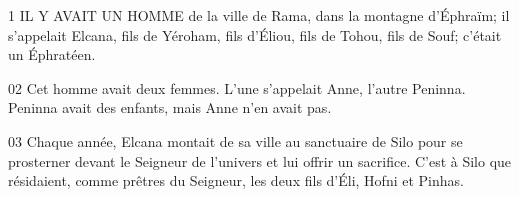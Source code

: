 1 IL Y AVAIT UN HOMME de la ville de Rama, dans la montagne d’Éphraïm; il s’appelait Elcana, fils de Yéroham, fils d’Éliou, fils de Tohou, fils de Souf; c’était un Éphratéen.

02 Cet homme avait deux femmes. L’une s’appelait Anne, l’autre Peninna. Peninna avait des enfants, mais Anne n’en avait pas.

03 Chaque année, Elcana montait de sa ville au sanctuaire de Silo pour se prosterner devant le Seigneur de l’univers et lui offrir un sacrifice. C’est à Silo que résidaient, comme prêtres du Seigneur, les deux fils d’Éli, Hofni et Pinhas.
